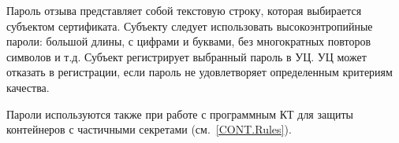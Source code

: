 Пароль отзыва представляет собой текстовую строку, которая выбирается 
субъектом сертификата. Субъекту следует использовать  
высокоэнтропийные пароли: большой длины, с цифрами и буквами, 
без многократных повторов символов и т.д.
%
Субъект регистрирует выбранный пароль в УЦ. УЦ может отказать в регистрации, 
если пароль не удовлетворяет определенным критериям качества. 

Пароли используются также при работе с программным КТ для защиты 
контейнеров с частичными секретами (см.~\ref{CONT.Rules}).

